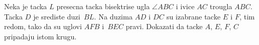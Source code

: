 \problem
Neka je tacka $L$ presecna tacka bisektrise ugla $\angle ABC$ i ivice $AC$ trougla $ABC$.
Tacka  $D$ je srediste duzi~$BL$.
Na duzima $AD$ i $DC$ su izabrane tacke $E$ i $F$, tim redom, tako da su uglovi $AFB$ i~$BEC$ pravi.
Dokazati da tacke $A$, $E$, $F$, $C$ pripadaju istom krugu.
\solution
\endproblem

